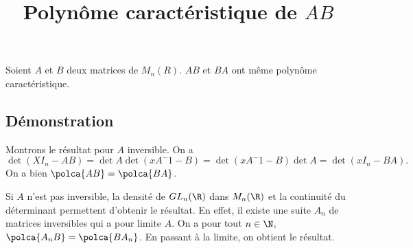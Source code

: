 \documentclass[fontsize=12pt,twoside=false,parskip=half]{scrartcl}
\title{Polynôme caractéristique de $AB$}
\date{}
\author{}
\begin{document}
\maketitle
   \begin{Theoreme}
      Soient $A$ et $B$ deux matrices de $M_n(R)$. $AB$ et $BA$ ont même polynôme caractéristique.  
   \end{Theoreme}
   \subsection{Démonstration}
      Montrons le résultat pour $A$ inversible. On a 
      \[
         \det(XI_n - AB) = \det A \det(xA^-1 - B) = \det(xA^-1 - B) \det A = \det(xI_n - BA).
      \]
      On a bien $\polca{AB} = \polca{BA}$.
      
      Si $A$ n’est pas inversible, la densité de $GL_n(\R)$ dans $M_n(\R)$ et la continuité du
      déterminant permettent d’obtenir le résultat. En effet, il existe une suite $A_n$ de matrices 
      inversibles qui a pour limite $A$. On a pour tout $n \in \N$, $\polca{A_nB} = \polca{BA_n}$.
      En passant à la limite, on obtient le résultat.
\end{document}
